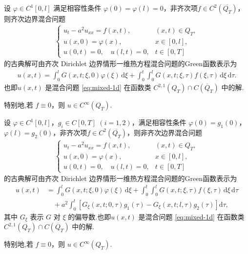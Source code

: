 \documentclass[../../main.tex]{subfiles}%
\begin{document}
\begin{theorem}
设 $\varphi\in C^1[0,l]$ 满足相容性条件 $\varphi(0)=\varphi(l)=0$，非齐次项$f\in C^2(\overline{Q_T})$，则齐次边界混合问题
\begin{align*}
\begin{cases}
u_t-a^2u_{xx}=f(x,t), & (x,t)\in Q_T,\\
u(x,0)=\varphi(x), & x\in[0,l],\\
u(0,t)=0,\quad u(l,t)=0, & t\in[0,T]
\end{cases}
\end{align*}
的古典解可由齐次 Dirichlet 边界情形一维热方程混合问题的Green函数表示为
\begin{align*}
u(x,t)=\int_0^l G(x,t;\xi,0)\varphi(\xi)\,\mathrm{d}\xi
+\int_0^t\int_0^l G(x,t;\xi,\tau)f(\xi,\tau)\,\mathrm{d}\xi\,\mathrm{d}\tau. 
\end{align*}
也即$u(x,t)$ 是混合问题 \eqref{eq:mixed-1d} 在函数类 $C^{2,1}(Q_T)\cap C(\overline{Q}_T)$ 中的解.

特别地,若 $f\equiv 0$，则 $u\in C^\infty(Q_T)$.
\end{theorem}

\begin{theorem}
设 $\varphi\in C^1[0,l]$，$g_i\in C[0,T]$ $(i=1,2)$，满足相容性条件 $\varphi(0)=g_1(0)$，$\varphi(l)=g_2(0)$，非齐次项$f\in C^2(\overline{Q_T})$，则非齐次边界混合问题
\begin{align*}
\begin{cases}
u_t-a^2u_{xx}=f(x,t), & (x,t)\in Q_T,\\
u(x,0)=\varphi(x), & x\in[0,l],\\
u(0,t)=0,\quad u(l,t)=0, & t\in[0,T]
\end{cases}
\end{align*}
的古典解可由齐次 Dirichlet 边界情形一维热方程混合问题的Green函数表示为
\begin{align*}
u(x,t)&=\int_0^l G(x,t;\xi,0)\varphi(\xi)\,\mathrm{d}\xi
+\int_0^t\int_0^l G(x,t;\xi,\tau)f(\xi,\tau)\,\mathrm{d}\xi\,\mathrm{d}\tau \nonumber \\
&\quad +a^2\int_0^t\left[G_\xi(x,t;0,\tau)g_1(\tau)-G_\xi(x,t;l,\tau)g_2(\tau)\right]\mathrm{d}\tau,
\end{align*}
其中 $G_\xi$ 表示 $G$ 对 $\xi$ 的偏导数.也即$u(x,t)$ 是混合问题 \eqref{eq:mixed-1d} 在函数类 $C^{2,1}(Q_T)\cap C(\overline{Q}_T)$ 中的解.

特别地,若 $f\equiv 0$，则 $u\in C^\infty(Q_T)$.
\end{theorem}
\end{document}
